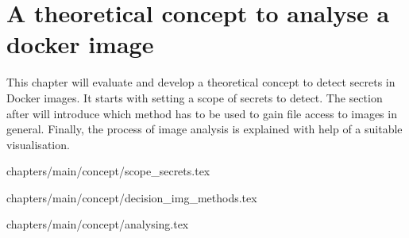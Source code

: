 \chapter{A theoretical concept to analyse a docker image}
\label{ch:theory}
This chapter will evaluate and develop a theoretical concept to detect secrets in Docker images. It starts with setting a scope of secrets to detect. The section after will introduce which method has to be used to gain file access to images in general. Finally, the process of image analysis is explained with help of a suitable visualisation.

 {chapters/main/concept/scope_secrets.tex}

 {chapters/main/concept/decision_img_methods.tex}

 {chapters/main/concept/analysing.tex}
